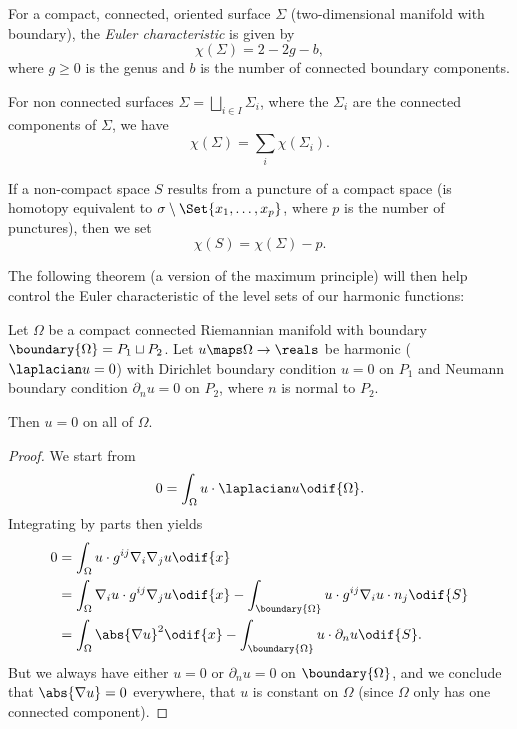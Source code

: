 \documentclass[titlepage,numbers=noenddot,headinclude,oneside,%
footinclude=true,cleardoublepage=empty,%
BCOR=5mm,paper=a4,fontsize=11pt,%
english,%
]{scrartcl}
\begin{document}
\begin{definition}
    For a compact, connected, oriented surface \( \Sigma \) (two-dimensional manifold with boundary), the \emph{Euler characteristic} is given by
    \begin{equation}
        \chi(\Sigma)=2-2g-b,\label{eq:def_euler_characteristic}
    \end{equation}
    where \( g\geq 0 \) is the genus and \( b \) is the number of connected boundary components.

    For non connected surfaces \( \Sigma=\bigsqcup_{i\in I} \Sigma_i \), where the \( \Sigma_i \) are the connected components of \( \Sigma \), we have
    \begin{equation*}
        \chi(\Sigma)=\sum_{i}\chi(\Sigma_i).
    \end{equation*}

    If a non-compact space \( S \) results from a puncture of a compact space (is homotopy equivalent to \( \sigma\setminus \Set{x_1,\dotsc,x_p} \), where \( p \) is the number of punctures), then we set
    \begin{equation*}
        \chi(S)=\chi(\Sigma)-p.\label{eq:def_euler_characteristic_noncompact}
    \end{equation*}
\end{definition}
The following theorem (a version of the maximum principle) will then help control the Euler characteristic of the level sets of our harmonic functions:
\begin{theorem}\label{thm:maximum_principle}
 Let \( \Omega \) be a compact connected Riemannian manifold with boundary \( \boundary{\Omega}=P_1\sqcup P_2 \). Let \( u\maps \Omega\to \reals \) be harmonic (\ie \( \laplacian u=0 \)) with Dirichlet boundary condition \( u= 0 \) on \( P_1 \) and Neumann boundary condition \( \partial_n u=0 \) on \( P_2 \), where \( n \) is normal to \( P_2 \).

 Then \( u=0 \) on all of \( \Omega \).
\end{theorem}
\begin{proof}
    We start from
    \begin{equation*}
        0=\int_\Omega u\cdot \laplacian u\odif{\Omega}.
    \end{equation*}
    Integrating by parts then yields
    \begin{align*}
        0&=\int_\Omega u\cdot g^{ij}\nabla_i \nabla_j u\odif{x}\\
        &=\int_\Omega \nabla_i u\cdot g^{ij} \nabla_j u\odif{x}-\int_{\boundary{\Omega}}u\cdot g^{ij}\nabla_i u \cdot n_j \odif{S}\\
        &=\int_\Omega \abs{\nabla u}^2\odif{x}-\int_{\boundary{\Omega}}u\cdot \partial_n u\odif{S}.
    \end{align*}
    But we always have either \( u=0 \) or \( \partial_n u=0 \) on \( \boundary{\Omega} \), and we conclude that \( \abs{\nabla u}=0 \) everywhere, \ie that \( u \) is constant on \( \Omega \) (since \( \Omega \) only has one connected component).
\end{proof}
\end{document}

